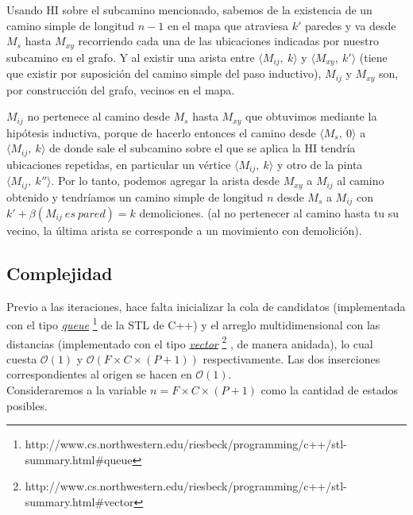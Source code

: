     Usando HI sobre el subcamino mencionado, sabemos de la existencia de un camino simple de longitud $n-1$ en el mapa que atraviesa $k'$ paredes y va desde $M_s$ hasta $M_{xy}$ recorriendo cada una de las ubicaciones indicadas por nuestro subcamino en el grafo. Y al existir una arista entre $\langle {M_{ij},\ k} \rangle$ y $\langle {M_{xy},\ k' } \rangle$ (tiene que existir por suposición del camino simple del paso inductivo), $M_{ij}$ y $M_{xy}$ son, por construcción del grafo, vecinos en el mapa.

    $M_{ij}$ no pertenece al camino desde $M_s$ hasta $M_{xy}$ que obtuvimos mediante la hipótesis inductiva, porque de hacerlo entonces el camino desde $\langle {M_{s},\ 0} \rangle$ a $\langle {M_{ij},\ k} \rangle$ de donde sale el subcamino sobre el que se aplica la HI tendría ubicaciones repetidas, en particular un vértice $\langle {M_{ij},\ k} \rangle$ y otro de la pinta $\langle {M_{ij},\ k''} \rangle$. Por lo tanto, podemos agregar la arista desde $M_{xy}$ a $M_{ij}$ al camino obtenido y tendríamos un camino simple de longitud $n$ desde $M_{s}$ a $M_{ij}$ con $k'+\beta(M_{ij}\ es\ pared) = k$ demoliciones.
    (al no pertenecer al camino hasta tu su vecino, la última arista se corresponde a un movimiento con demolición).
    \QEDB
    \\

\subsection{Complejidad}

    Previo a las iteraciones, hace falta inicializar la cola de candidatos (implementada con el tipo \href{http://www.cs.northwestern.edu/~riesbeck/programming/c++/stl-summary.html#queue}{\emph{queue}} \footnote{
        http://www.cs.northwestern.edu/\texttildelow riesbeck/programming/c++/stl-summary.html\#queue
    } de la STL de C++) y el arreglo multidimensional con las distancias (implementado con el tipo \href{http://www.cs.northwestern.edu/~riesbeck/programming/c++/stl-summary.html#vector}{\emph{vector}}
    \footnote{
        http://www.cs.northwestern.edu/\texttildelow riesbeck/programming/c++/stl-summary.html\#vector
    }
    , de manera anidada), lo cual cuesta  $\mathcal{O}(1)$ y  $\mathcal{O}(F\times C\times (P+1))$ respectivamente. Las dos inserciones correspondientes al origen se hacen en $\mathcal{O}(1)$.
    \\

    Consideraremos a la variable $n = F\times C\times (P+1)$ como la cantidad de estados posibles.

